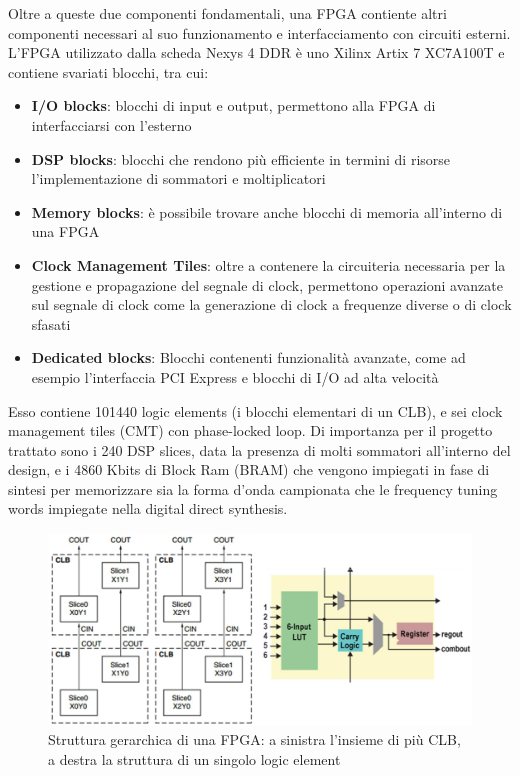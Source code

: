 Oltre a queste due componenti fondamentali, una FPGA contiente altri
componenti necessari al suo funzionamento e interfacciamento con
circuiti esterni.
L'FPGA utilizzato dalla scheda Nexys 4 DDR è uno Xilinx Artix 7 XC7A100T
e contiene svariati blocchi\cite{artix7overview}, tra cui:

\begin{itemize}
    \item \textbf{I/O blocks}: blocchi di input e output,
           permettono alla FPGA di interfacciarsi con l'esterno
    \item \textbf{DSP blocks}: blocchi che rendono più efficiente in termini
           di risorse l'implementazione di sommatori e moltiplicatori
    \item \textbf{Memory blocks}: è possibile trovare anche blocchi di
           memoria all'interno di una FPGA
    \item \textbf{Clock Management Tiles}: oltre a contenere la circuiteria
            necessaria per la gestione e propagazione del segnale di clock,
            permettono operazioni avanzate sul segnale di clock come la
            generazione di clock a frequenze diverse o di clock sfasati
    \item \textbf{Dedicated blocks}: Blocchi contenenti funzionalità avanzate,
            come ad esempio l'interfaccia PCI Express e blocchi di I/O ad alta
            velocità
\end{itemize}

Esso contiene 101440 logic elements (i blocchi elementari di un CLB), e sei
clock management tiles (CMT) con phase-locked loop.
Di importanza per il progetto trattato sono i 240 DSP slices, 
data la presenza di molti sommatori all'interno del design,
 e i 4860 Kbits di Block Ram (BRAM) che vengono impiegati in fase di 
sintesi per memorizzare sia la forma d'onda campionata che
le frequency tuning words impiegate nella digital direct synthesis.

\begin{figure}[H]
	\centering
	\def\svgwidth{\columnwidth}
	\includegraphics[width=0.8\columnwidth]{TeX_files/CLB.png}
    \caption{Struttura gerarchica di una FPGA: a sinistra l'insieme di più CLB,
    a destra la struttura di un singolo logic element}
\end{figure}
